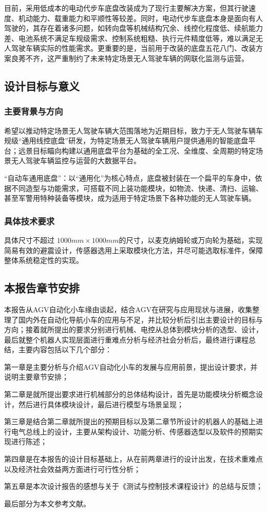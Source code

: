 目前，采用低成本的电动代步车底盘改装成为了现行主要解决方案，但其行驶速度、机动能力、载重能力和平顺性等较差。同时，电动代步车底盘本身是面向有人驾驶的，其存在着诸多问题，如转向盘等机械结构冗余、线控化程度低、续航能力差、电池系统不满足车规级需求、控制系统粗糙、执行元件精度低等，难以满足无人驾驶车辆实际的性能需求。更重要的是，当前用于改装的底盘五花八门、改装方案良莠不齐，这严重制约了未来特定场景无人驾驶车辆的网联化监测与运营。

\subsection{设计目标与意义}

\subsubsection{主要背景与方向}

希望以推动特定场景无人驾驶车辆大范围落地为近期目标，致力于无人驾驶车辆车规级“通用线控底盘”研发，为特定场景无人驾驶车辆用户提供通用的智能底盘平台；远景目标瞄向构建以通用底盘平台为基础的全工况、全维度、全周期的特定场景无人驾驶车辆监控与运营的大数据平台。

“自动车通用底盘”：以“通用化”为核心特点，底盘被封装在一个扁平的车身中，依据不同造型与功能需求，可搭载不同上装功能模块，如物流、快递、清扫、运输、甚至军警用特种装备等模块，成为适用于特定场景下各种功能的无人驾驶车辆。

\subsubsection{具体技术要求}

具体尺寸不超过 $ 1000mm \times 1000mm $的尺寸，以麦克纳姆轮或万向轮为基础，实现简易有效的避震设计，传感器选用上采取模块化方法，并尽可能选取标准件，保障整体系统稳定性的实现。

\subsection{本报告章节安排}

本报告从AGV自动化小车缘由谈起，结合AGV在研究与应用现状与进展，收集整理了国内外在自动化导航小车的应用与不足，并比较分析后引出主要设计的目标与方向；接着就所提出的要求分别进行机械、电控从总体到模块分析的选型、设计，最后就整个机器人实现层面进行重难点分析与经济社会分析后，最终进行课程总结，主要内容包括以下几个部分：

第一章是主要分析与介绍AGV自动化小车的发展与应用前景，提出设计要求，并说明主要章节安排；

第二章是就所提出要求进行机械部分的总体结构设计，首先是功能模块分析概念设计，然后进行具体模块设计，最后进行模型与场景呈现；

第三章是结合第二章就所提出的预期目标以及第二章节所设计的机器人的基础上进行电气总线上的设计，主要从架构设计、功能分析、传感器选型以及软件的预期实现进行陈述；

第四章是在本报告的设计目标基础上，从在前两章进行的设计出发，在技术重难点以及经济社会效益两方面进行可行性分析；

第五章是本次设计报告的感想与关于《测试与控制技术课程设计》的总结与反馈；

最后部分为本文参考文献。